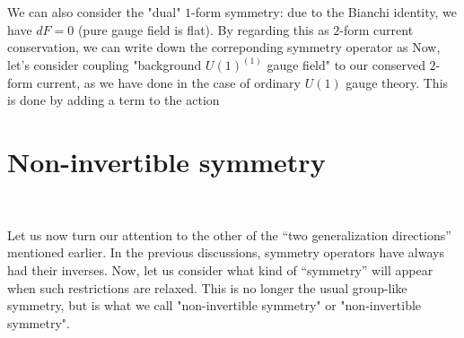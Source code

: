 \documentclass{ltjsarticle}
\theoremstyle{mystyle} %
\numberwithin{equation}{section}
\begin{document}
 We can also consider the "dual" $1$-form symmetry: due to the Bianchi identity, we have $dF=0$ 
(pure gauge field is flat). By regarding this as $2$-form current conservation, we can write down the correponding symmetry operator as
%
Now, let's consider coupling "background $U(1)^{(1)}$ gauge field" to our conserved $2$-form current, as we have done in the case of ordinary $U(1)$ gauge theory. 
This is done by adding a term to the action
\subsection{}
\section{Non-invertible symmetry}
　

Let us now turn our attention to the other of the “two generalization directions” mentioned earlier. 
In the previous discussions, symmetry operators have always had their inverses. 
Now, let us consider what kind of “symmetry” will appear when such restrictions are relaxed. 
This is no longer the usual group-like symmetry, but is what we call "non-invertible symmetry" or "non-invertible symmetry". \\
\end{document}
